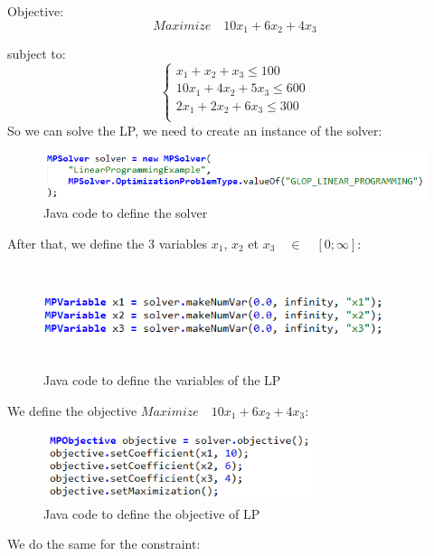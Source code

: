 \documentclass{report}
\begin{document}
Objective:  
\begin{equation}
Maximize \quad 10x_1 + 6x_2 + 4x_3
\end{equation}

subject to: \\
\begin{equation}
	\begin{cases}
		x_1 + x_2 + x_3 \leq 100\\
		10x_1 + 4x_2 + 5x_3 \leq 600\\
		2x_1 + 2x_2 + 6x_3 \leq 300\\
	\end{cases}
\end{equation}
So we can solve the LP, we need to create an instance of the solver:
\begin{figure}[H]
    	\centering
	\includegraphics[width=\textwidth]{lp-solver.png}
	\caption{Java code to define the solver}
\end{figure}
After that, we define the 3 variables $x_1$, $x_2$ et $x_3 \quad  \in \quad [0 ; \infty]$: \\
\begin{figure}[H]
    	\centering
	\includegraphics[width=10cm,height=3cm,keepaspectratio]{lp-variables.png}
	\caption{Java code to define the variables of the LP}
\end{figure}
We define the objective $Maximize \quad 10x_1 + 6x_2 + 4x_3$: \\
\begin{figure}[H]
    	\centering
	\includegraphics[width=8cm,height=2cm,keepaspectratio]{lp-objectif.png}
	\caption{Java code to define the objective of LP}
\end{figure}
We do the same for the constraint: \\
\end{document}
